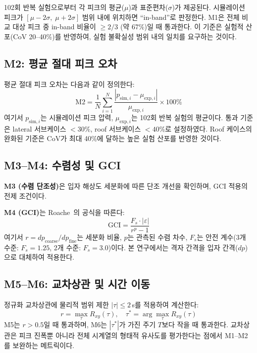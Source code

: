 \documentclass[11pt]{article}
\begin{document}
102회 반복 실험으로부터 각 피크의 평균($\mu$)과 표준편차($\sigma$)가 제공된다.
시뮬레이션 피크가 $[\mu - 2\sigma,\; \mu + 2\sigma]$ 범위 내에 위치하면
``in-band''로 판정한다.
M1은 전체 비교 대상 피크 중 in-band 비율이 $\geq 2/3$ (약 67\%)일 때 통과한다.
이 기준은 실험적 산포(CoV 20--40\%)를 반영하여, 실험 불확실성 범위 내의 일치를
요구하는 것이다.


\subsection{M2: 평균 절대 피크 오차} \label{sec:m2}

평균 절대 피크 오차는 다음과 같이 정의한다:
\begin{equation}
    \text{M2} = \frac{1}{N}\sum_{i=1}^{N}
    \frac{|p_{\text{sim},i} - \mu_{\text{exp},i}|}{\mu_{\text{exp},i}}
    \times 100\%
    \label{eq:m2}
\end{equation}
여기서 $p_{\text{sim},i}$는 시뮬레이션 피크 압력, $\mu_{\text{exp},i}$는 102회
반복 실험의 평균이다.
통과 기준은 lateral 서브케이스 $<30\%$, roof 서브케이스 $<40\%$로 설정하였다.
Roof 케이스의 완화된 기준은 CoV가 최대 40\%에 달하는 높은 실험 산포를 반영한 것이다.


\subsection{M3--M4: 수렴성 및 GCI} \label{sec:m3-m4}

\textbf{M3 (수렴 단조성)}은 입자 해상도 세분화에 따른 단조 개선을 확인하며,
GCI 적용의 전제 조건이다.

\textbf{M4 (GCI)}는 Roache~\cite{Roache1998}의 공식을 따른다:
\begin{equation}
    \text{GCI} = \frac{F_s \cdot |\varepsilon|}{r^p - 1}
    \label{eq:gci}
\end{equation}
여기서 $r = dp_\text{coarse}/dp_\text{fine}$는 세분화 비율,
$p$는 관측된 수렴 차수, $F_s$는 안전 계수(3개 수준: $F_s = 1.25$, 2개 수준: $F_s = 3.0$)이다.
본 연구에서는 격자 간격을 입자 간격($dp$)으로 대체하여 적용한다.


\subsection{M5--M6: 교차상관 및 시간 이동} \label{sec:m5-m6}

정규화 교차상관에 물리적 범위 제한 $|\tau| \leq 2$\,s를 적용하여 계산한다:
\begin{equation}
    r = \max_\tau R_{xy}(\tau), \quad \tau^* = \arg\max_\tau R_{xy}(\tau)
    \label{eq:xcorr}
\end{equation}
M5는 $r > 0.5$일 때 통과하며, M6는 $|\tau^*|$가 가진 주기 $T$보다 작을 때 통과한다.
교차상관은 피크 진폭뿐 아니라 전체 시계열의 형태적 유사도를 평가한다는 점에서
M1--M2를 보완하는 메트릭이다.
\end{document}
